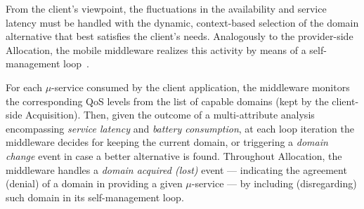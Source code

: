 From the client's viewpoint, the fluctuations in the availability and service latency must be handled with the dynamic, context-based selection of the domain alternative 
that best satisfies the client's needs. 
Analogously to the provider-side Allocation, the mobile middleware realizes this activity by means of a self-management loop~\cite{kephart2003vision}. 

For each $\mu$-service consumed by the client application, the middleware monitors the corresponding QoS levels from the list of capable domains (kept by the client-side Acquisition). Then, given the outcome of a multi-attribute analysis encompassing \textit{service latency} and \textit{battery consumption}, at each loop iteration the middleware decides for keeping the current domain, or triggering a \textit{domain change} event in case a better alternative is found. Throughout Allocation, the middleware handles a \textit{domain acquired (lost)} event --- indicating the agreement (denial) of a domain in providing a given $\mu$-service --- by including (disregarding) such domain in its self-management loop. %



%		
%		
%		
%		



